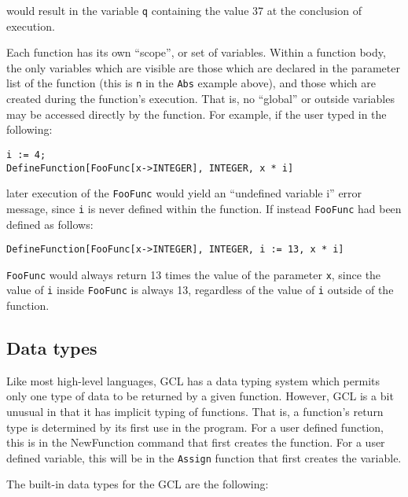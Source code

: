 \noindent would result in the variable \verb+q+ containing the value 37
at the conclusion of execution.

Each function has its own ``scope'', or set of variables.  Within a function
body, the only variables which are visible are those which are declared
in the parameter list of the function (this is \verb+n+ in the \verb+Abs+
example above), and those which are created during the function's execution.
That is, no ``global'' or outside variables may be accessed directly by the
function.  For example, if the user typed in the following:

\begin{verbatim}
i := 4;
DefineFunction[FooFunc[x->INTEGER], INTEGER, x * i]
\end{verbatim}

\noindent later execution of the \verb+FooFunc+ would yield an ``undefined
variable i'' error message, since \verb+i+ is never defined within the
function.  If instead \verb+FooFunc+ had been defined as follows:

\begin{verbatim}
DefineFunction[FooFunc[x->INTEGER], INTEGER, i := 13, x * i]
\end{verbatim}

\noindent \verb+FooFunc+ would always return 13 times the value of the
parameter \verb+x+, since the value of \verb+i+ inside \verb+FooFunc+ is
always 13, regardless of the value of \verb+i+ outside of the function.


\subsection{Data types}

Like most high-level languages, GCL has a data typing system which
permits only one type of data to be returned by a given function.
However, GCL is a bit unusual in that it has implicit typing of
functions.  That is, a function's return type is determined by its
first use in the program.  For a user defined function, this is in the
NewFunction command that first creates the function.  For a user
defined variable, this will be in the \verb+Assign+ function that
first creates the variable.

The built-in data types for the GCL are the following:  

\medskip

